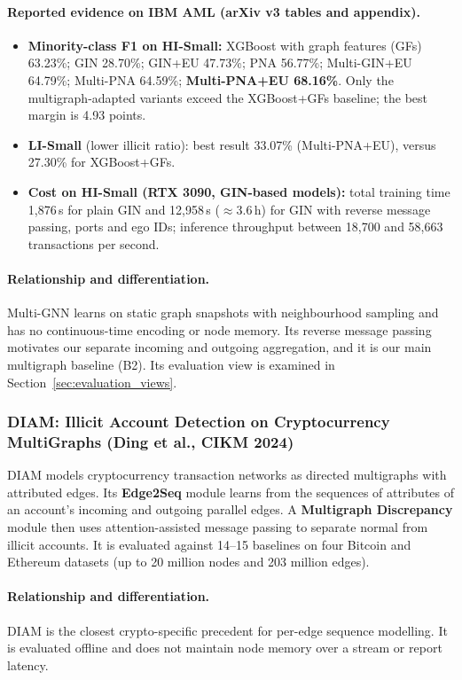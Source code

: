 \documentclass[11pt,a4paper]{article}
\begin{document}
\paragraph{Reported evidence on IBM AML (arXiv v3 tables and appendix).}
\begin{itemize}[leftmargin=*]
    \item \textbf{Minority-class F1 on HI-Small:} XGBoost with graph features (GFs) 63.23\%; GIN 28.70\%; GIN+EU 47.73\%; PNA 56.77\%; Multi-GIN+EU 64.79\%; Multi-PNA 64.59\%; \textbf{Multi-PNA+EU 68.16\%}. Only the multigraph-adapted variants exceed the XGBoost+GFs baseline; the best margin is 4.93 points.
    \item \textbf{LI-Small} (lower illicit ratio): best result 33.07\% (Multi-PNA+EU), versus 27.30\% for XGBoost+GFs.
    \item \textbf{Cost on HI-Small (RTX 3090, GIN-based models):} total training time 1,876\,s for plain GIN and 12,958\,s ($\approx$3.6\,h) for GIN with reverse message passing, ports and ego IDs; inference throughput between 18,700 and 58,663 transactions per second.
\end{itemize}

\paragraph{Relationship and differentiation.} Multi-GNN learns on static graph snapshots with neighbourhood sampling and has no continuous-time encoding or node memory. Its reverse message passing motivates our separate incoming and outgoing aggregation, and it is our main multigraph baseline (B2). Its evaluation view is examined in Section~\ref{sec:evaluation_views}.

\subsubsection{DIAM: Illicit Account Detection on Cryptocurrency MultiGraphs (Ding et al., CIKM 2024)}
DIAM \cite{ding2024diam} models cryptocurrency transaction networks as directed multigraphs with attributed edges. Its \textbf{Edge2Seq} module learns from the sequences of attributes of an account's incoming and outgoing parallel edges. A \textbf{Multigraph Discrepancy} module then uses attention-assisted message passing to separate normal from illicit accounts. It is evaluated against 14--15 baselines on four Bitcoin and Ethereum datasets (up to 20 million nodes and 203 million edges).

\paragraph{Relationship and differentiation.} DIAM is the closest crypto-specific precedent for per-edge sequence modelling. It is evaluated offline and does not maintain node memory over a stream or report latency.
\end{document}

